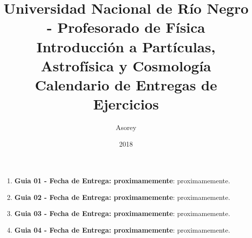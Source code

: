 \documentclass[a4paper,12pt]{article}
\begin{document}
\title{
{\normalsize{Universidad Nacional de Río Negro - Profesorado de Física}}\\
Introducción a Partículas, Astrofísica y Cosmología\\ Calendario de Entregas de Ejercicios}
\author{Asorey}
\date{2018}
\maketitle

\begin{enumerate}
	\item {\bf{Guia 01 - Fecha de Entrega: proximamemente}}: proximamemente. 
	\item {\bf{Guia 02 - Fecha de Entrega: proximamemente}}: proximamemente. 
	\item {\bf{Guia 03 - Fecha de Entrega: proximamemente}}: proximamemente. 
	\item {\bf{Guia 04 - Fecha de Entrega: proximamemente}}: proximamemente. 
\end{enumerate}
\end{document}
